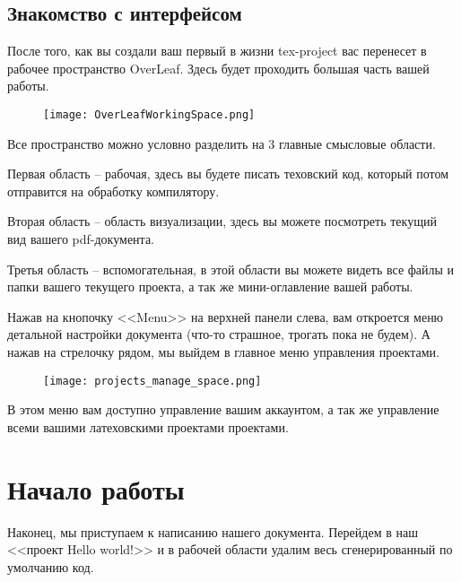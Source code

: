     \subsection{Знакомство с интерфейсом}

    После того, как вы создали ваш первый в жизни tex-project вас перенесет в рабочее пространство OverLeaf. Здесь будет
    проходить большая часть вашей работы.

    \begin{figure}[h!]
        \centering
        \texttt{[image: OverLeafWorkingSpace.png]}
        \caption{}
    \end{figure}

    Все пространство можно условно разделить на 3 главные смысловые области. 
    
    Первая область -- рабочая, здесь вы будете писать
    теховский код, который потом отправится на обработку компилятору. 
    
    Вторая область -- область визуализации, здесь вы
    можете посмотреть текущий вид вашего pdf-документа. 
    
    Третья область -- вспомогательная, в этой области вы можете видеть
    все файлы и папки вашего текущего проекта, а так же мини-оглавление вашей работы.


    Нажав на кнопочку <<Menu>> на верхней панели слева, вам откроется меню детальной настройки документа (что-то страшное, трогать пока не будем).
    А нажав на стрелочку рядом, мы выйдем в главное меню управления проектами.

    \begin{figure}[h!]
        \centering
        \texttt{[image: projects\_manage\_space.png]}
        \caption{}
    \end{figure}

    В этом меню вам доступно управление вашим аккаунтом, а так же управление всеми вашими латеховскими проектами проектами.

    \section{Начало работы}

    Наконец, мы приступаем к написанию нашего документа. Перейдем в наш <<проект Hello world!>> и в рабочей области удалим весь сгенерированный по умолчанию код.

